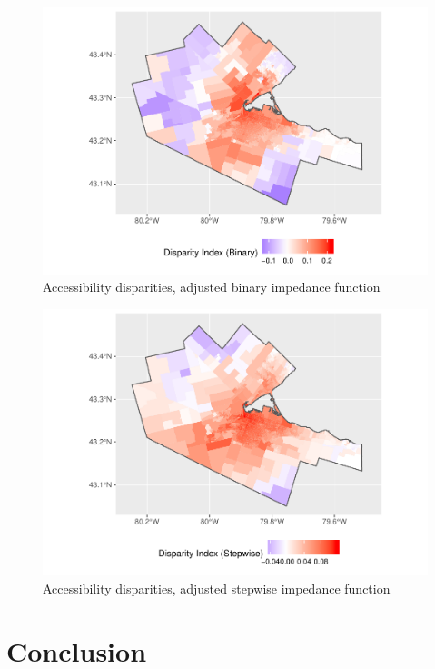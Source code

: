 \documentclass[10pt,letterpaper]{article}
\begin{document}
\begin{figure}
\includegraphics[width=0.95\linewidth]{Supply_and_Demand_Inflation_in_FCA_Methods_v2.1_files/figure-latex/fig21-map-disparities-binary-1} \caption{\label{fig:fig21-map-disparities-binary}Accessibility disparities, adjusted binary impedance function}\label{fig:fig21-map-disparities-binary}
\end{figure}

\begin{figure}
\includegraphics[width=0.95\linewidth]{Supply_and_Demand_Inflation_in_FCA_Methods_v2.1_files/figure-latex/fig22-map-disparities-stepwise-1} \caption{\label{fig:fig22-map-disparities-stepwise}Accessibility disparities, adjusted stepwise impedance function}\label{fig:fig22-map-disparities-stepwise}
\end{figure}

\section{Conclusion}\label{conclusion}
\end{document}
